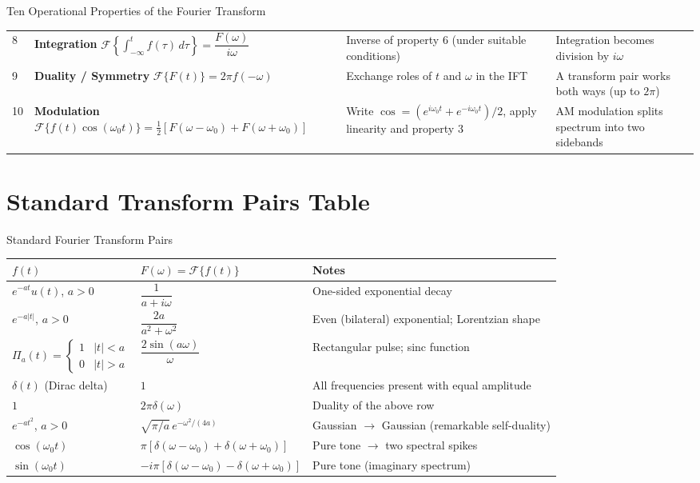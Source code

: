 \documentclass[12pt,a4paper]{article}
\begin{document}
\begin{infobox}{Ten Operational Properties of the Fourier Transform}
\begin{tabular}{@{} l p{5.2cm} p{3.5cm} p{3.8cm} @{}}
8 & \textbf{Integration} \newline
    $\mathcal{F}\!\left\{\int_{-\infty}^t f(\tau)\,d\tau\right\} = \dfrac{F(\omega)}{i\omega}$ &
    Inverse of property 6 (under suitable conditions) &
    Integration becomes division by $i\omega$ \\

9 & \textbf{Duality / Symmetry} \newline
    $\mathcal{F}\{F(t)\} = 2\pi f(-\omega)$ &
    Exchange roles of $t$ and $\omega$ in the IFT &
    A transform pair works both ways (up to $2\pi$) \\

10 & \textbf{Modulation} \newline
     $\mathcal{F}\{f(t)\cos(\omega_0 t)\} = \frac{1}{2}[F(\omega-\omega_0)+F(\omega+\omega_0)]$ &
     Write $\cos = (e^{i\omega_0 t}+e^{-i\omega_0 t})/2$, apply linearity and property 3 &
     AM modulation splits spectrum into two sidebands \\
\bottomrule
\end{tabular}
\end{infobox}

\section{Standard Transform Pairs Table}

\begin{infobox}{Standard Fourier Transform Pairs}
\renewcommand{\arraystretch}{1.6}
\begin{tabular}{@{} l l p{5.5cm} @{}}
\toprule
$f(t)$ & $F(\omega) = \mathcal{F}\{f(t)\}$ & Notes \\
\midrule
$e^{-at}u(t)$, $a>0$ & $\dfrac{1}{a + i\omega}$ & One-sided exponential decay \\
$e^{-a|t|}$, $a>0$ & $\dfrac{2a}{a^2+\omega^2}$ & Even (bilateral) exponential; Lorentzian shape \\
$\Pi_a(t) = \begin{cases}1 & |t|<a \\ 0 & |t|>a\end{cases}$ &
  $\dfrac{2\sin(a\omega)}{\omega}$ & Rectangular pulse; sinc function \\
$\delta(t)$ (Dirac delta) & $1$ & All frequencies present with equal amplitude \\
$1$ & $2\pi\delta(\omega)$ & Duality of the above row \\
$e^{-at^2}$, $a>0$ & $\sqrt{\pi/a}\,e^{-\omega^2/(4a)}$ & Gaussian $\to$ Gaussian (remarkable self-duality) \\
$\cos(\omega_0 t)$ & $\pi[\delta(\omega-\omega_0)+\delta(\omega+\omega_0)]$ & Pure tone $\to$ two spectral spikes \\
$\sin(\omega_0 t)$ & $-i\pi[\delta(\omega-\omega_0)-\delta(\omega+\omega_0)]$ & Pure tone (imaginary spectrum) \\
\bottomrule
\end{tabular}
\end{infobox}
\end{document}
